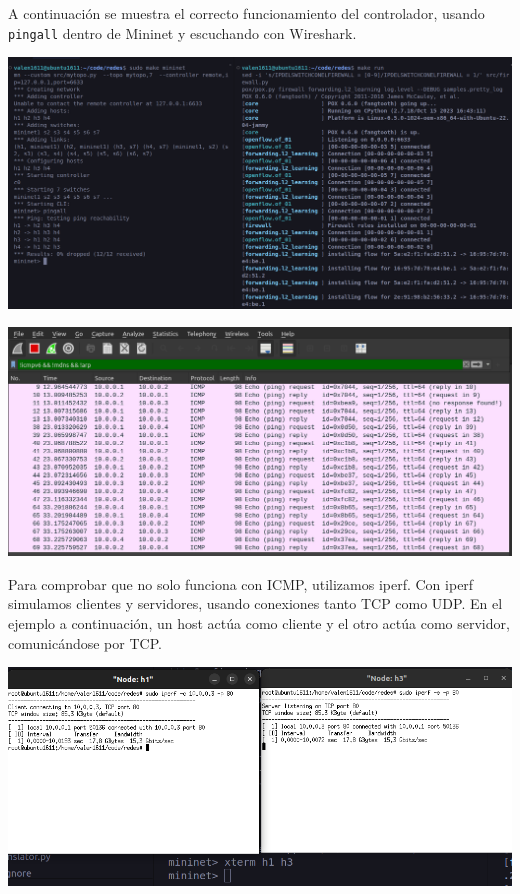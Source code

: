 \documentclass{article}
\begin{document}
A continuación se muestra el correcto funcionamiento del controlador, usando \texttt{pingall} dentro de Mininet y escuchando con Wireshark.

\begin{center}
  \includegraphics[scale=0.20]{mininet_pingall.png}

\end{center}

\begin{center}
  \includegraphics[scale=0.3]{pingAll_WS.png}

\end{center}
  
Para comprobar que no solo funciona con ICMP, utilizamos iperf. Con iperf simulamos clientes y servidores, usando conexiones tanto TCP como UDP. En el ejemplo a continuación, un host actúa como cliente y el otro actúa como servidor, comunicándose por TCP.

\begin{center}
\includegraphics[scale=0.37]{mininet_iperf_basico.png}

\end{center}
\end{document}
